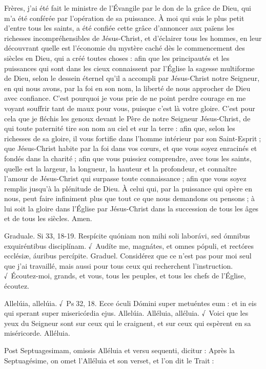 \begin{paracol}{2}
Frères, j’ai été fait le ministre de l’Évangile par le don de la grâce de Dieu, qui m’a été conférée par l’opération de sa puissance. À moi qui suis le plus petit d’entre tous les saints, a été confiée cette grâce d’annoncer aux païens les richesses incompréhensibles de Jésus-Christ, et d’éclairer tous les hommes, en leur découvrant quelle est l’économie du mystère caché dès le commencement des siècles en Dieu, qui a créé toutes choses : afin que les principautés et les puissances qui sont dans les cieux connaissent par l’Église la sagesse multiforme de Dieu, selon le dessein éternel qu’il a accompli par Jésus-Christ notre Seigneur, en qui nous avons, par la foi en son nom, la liberté de nous approcher de Dieu avec confiance. C’est pourquoi je vous prie de ne point perdre courage en me voyant souffrir tant de maux pour vous, puisque c’est là votre gloire. C’est pour cela que je fléchis les genoux devant le Père de notre Seigneur Jésus-Christ, de qui toute paternité tire son nom au ciel et sur la terre : afin que, selon les richesses de sa gloire, il vous fortifie dans l’homme intérieur par son Saint-Esprit ; que Jésus-Christ habite par la foi dans vos cœurs, et que vous soyez enracinés et fondés dans la charité ; afin que vous puissiez comprendre, avec tous les saints, quelle est la largeur, la longueur, la hauteur et la profondeur, et connaître l’amour de Jésus-Christ qui surpasse toute connaissance ; afin que vous soyez remplis jusqu’à la plénitude de Dieu. À celui qui, par la puissance qui opère en nous, peut faire infiniment plus que tout ce que nous demandons ou pensons ; à lui soit la gloire dans l’Église par Jésus-Christ dans la succession de tous les âges et de tous les siècles. Amen.
\switchcolumn*

Graduale. Si 33, 18-19. Respícite quóniam non mihi soli laborávi, sed ómnibus exquiréntibus disciplínam. √~Audíte me, magnátes, et omnes pópuli, et rectóres ecclésiæ, áuribus percípite.
\switchcolumn
Graduel. Considérez que ce n’est pas pour moi seul que j’ai travaillé, mais aussi pour tous ceux qui recherchent l’instruction. √~Écoutez-moi, grands, et vous, tous les peuples, et tous les chefs de l’Église, écoutez.
\switchcolumn*

Allelúia, allelúia. √~Ps 32, 18. Ecce óculi Dómini super metuéntes eum : et in eis qui sperant super misericórdia ejus. Allelúia.
\switchcolumn
Alléluia, alléluia. √~Voici que les yeux du Seigneur sont sur ceux qui le craignent, et sur ceux qui espèrent en sa miséricorde. Alléluia.
\switchcolumn*

Post Septuagesimam, omissis Alléluia et versu sequenti, dicitur :
\switchcolumn
Après la Septuagésime, on omet l’Alléluia et son verset, et l’on dit le Trait :
\switchcolumn*


\end{paracol}
